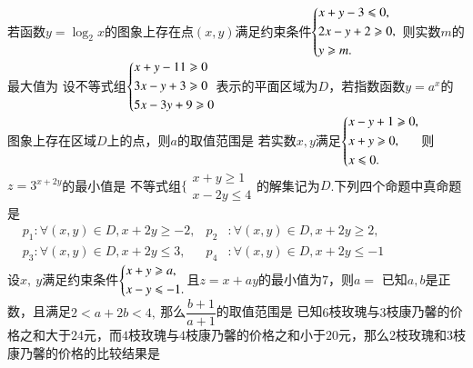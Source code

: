 \documentclass{BHCexam}
\begin{document}
\begin{questions}
\qs 若函数$ y=\log_2x $的图象上存在点$ (x,y) $满足约束条件$ \begin{dcases}
x+y-3\le0,\\
2x-y+2\ge0,\\
y\ge m.
\end{dcases} $ 则实数$ m $的最大值为\xx
{}
\qs 设不等式组$ \begin{dcases}
x+y-11\ge 0\\3x-y+3\ge 0\\5x-3y+9\ge 0
\end{dcases} $表示的平面区域为$ D $，若指数函数$ y=a^x $的图象上存在区域$ D $上的点，则$ a $的取值范围是\xx
\onech{$\left(1,3\right]$}{$\left[2,3\right]$}{$\left(1,2\right]$}{$\left[3,+\infty\right)$}
\qs 若实数$ x,y $满足$\begin{dcases}
x-y+1\ge 0,\\
x+y\ge 0,\\
x\le0.
\end{dcases}$则$ z=3^{x+2y} $的最小值是\xx
{}
\qs 不等式组$ \Bigg\{ \begin{aligned}
x+y\ge1\\
x-2y\le 4
\end{aligned} $的解集记为$ D $.下列四个命题中真命题是\xx\\
$ \begin{aligned}
&p_1:\forall(x,y)\in D,x+2y\ge-2, &p_2&:\forall(x,y)\in D,x+2y\ge2,\\
&p_3:\forall(x,y)\in D,x+2y\le 3, &p_4&:\forall(x,y)\in D,x+2y\le-1 
\end{aligned}$\\
\qs 设$x,~y$满足约束条件$\begin{dcases}
x+y\ge a,\\
x-y\le -1.
\end{dcases}$且$ z=x+ay $的最小值为$ 7 $，则$ a= $\xx
{}
\qs 已知$ a,b $是正数，且满足$ 2<a+2b<4, ~$那么$ \dfrac{b+1}{a+1} $的取值范围是\xx
{}
\qs 已知$ 6 $枝玫瑰与$ 3 $枝康乃馨的价格之和大于$ 24 $元，而$ 4 $枝玫瑰与$ 4 $枝康乃馨的价格之和小于$ 20 $元，那么$ 2 $枝玫瑰和$ 3 $枝康乃馨的价格的比较结果是\xx
{}








\end{questions}
\end{document}
